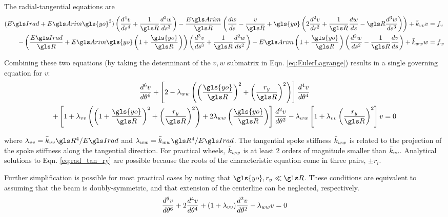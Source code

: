 \documentclass[\rootdir/thesis.tex]{subfiles}
\begin{document}
The radial-tangential equations are
\begin{subequations}
\begin{align}
\label{eq:rad_tan_2}
(\EIr + \EA \gls{yo}^2)\left( \ds{v}{4} + \frac{1}{\R}\ds{w}{3} \right) -
    \frac{\EA}{\R}\left( \frac{dw}{ds} - \frac{v}{\R} +\gls{yo}\left(2\ds{v}{2} + \frac{1}{\R}\frac{dw}{ds} -
    \R\ds{w}{3}\right) \right) +\bar{k}_{vv}v &= f_v\\
-\left( \frac{\EIr}{\R} + \EA \gls{yo}\left( 1 + \frac{\gls{yo}}{\R} \right) \right)
    \left(\ds{v}{3} + \frac{1}{\R}\ds{w}{2} \right) -
    \EA\left(1+\frac{\gls{yo}}{\R} \right) \left(\ds{w}{2} - \frac{1}{\R}\frac{dv}{ds} \right) + \bar{k}_{ww}w &= f_w
\end{align}
\end{subequations}

Combining these two equations (by taking the determinant of the $v,w$ submatrix in Eqn. \eqref{eq:EulerLagrange}) results in a single governing equation for $v$:
\begin{multline}
\label{eq:rad_tan_ry}
\dt{v}{6} + \left[2-\lr_{ww}\left(\left(\frac{\gls{yo}}{\R}\right)^2 +
                                        \left(\frac{\ry}{\R}\right)^2 \right) \right] \dt{v}{4}\\
          + \left[1+\lr_{vv}\left(\left(1+\frac{\gls{yo}}{\R}\right)^2+\left(\frac{\ry}{\R}\right)^2\right)
                   +2\lr_{ww}\left(\frac{\gls{yo}}{\R}\right)\right]\dt{v}{2}
          - \lr_{ww}\left[1+\lr_{vv}\left(\frac{\ry}{\R}\right)^2\right] v = 0
\end{multline}

where $\lr_{vv}=\kvv\R^4/\EIr$ and $\lr_{ww}=\kww\R^4/\EIr$. The tangential spoke stiffness $\bar{k}_{ww}$ is related to the projection of the spoke stiffness along the tangential direction. For practical wheels, $\bar{k}_{ww}$ is at least 2 orders of magnitude smaller than $\bar{k}_{vv}$. Analytical solutions to Eqn. \eqref{eq:rad_tan_ry} are possible because the roots of the characteristic equation come in three pairs, $\pm r_i$.

Further simplification is possible for most practical cases by noting that $\gls{yo},\ry \ll \R$. These conditions are equivalent to assuming that the beam is doubly-symmetric, and that extension of the centerline can be neglected, respectively.
\begin{equation}
\label{eq:rad_tan}
\frac{d^6v}{d\theta^6} + 2\frac{d^4v}{d\theta^4}+(1+\lambda_{vv})\frac{d^2v}{d\theta^2} - \lambda_{ww}v=0
\end{equation}
\end{document}
